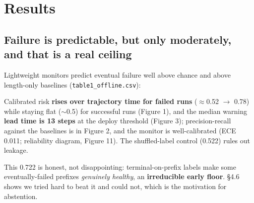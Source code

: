 \section{Results}
\subsection{Failure is predictable, but only moderately, and that is a real ceiling}
Lightweight monitors predict eventual failure well above chance and above length-only baselines (\texttt{table1\_offline.csv}):

\begin{center}\small
{}
\end{center}
Calibrated risk \textbf{rises over trajectory time for failed runs} ($\approx$0.52 $\to$ 0.78) while staying flat ($\sim$0.5) for successful runs (Figure 1), and the median warning \textbf{lead time is 13 steps} at the deploy threshold (Figure 3); precision-recall against the baselines is in Figure 2, and the monitor is well-calibrated (ECE 0.011; reliability diagram, Figure 11). The shuffled-label control (0.522) rules out leakage.

This 0.722 is honest, not disappointing: terminal-on-prefix labels make some eventually-failed prefixes \emph{genuinely healthy}, an \textbf{irreducible early floor}. \S4.6 shows we tried hard to beat it and could not, which is the motivation for abstention.

